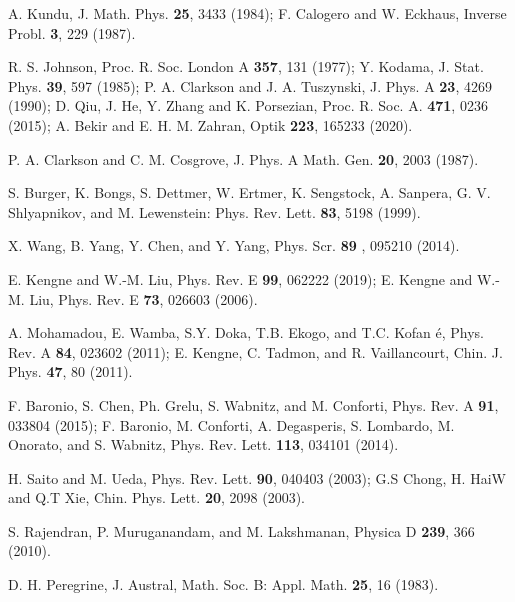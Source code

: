 \documentclass[preprintnumbers]{revtex4}
\begin{document}
\begin{thebibliography}{99}
 A. Kundu, J. Math. Phys. \textbf{25}, 3433 (1984); F. Calogero
and W. Eckhaus, Inverse Probl. \textbf{3}, 229 (1987).

 R. S. Johnson, Proc. R. Soc. London A \textbf{357}, 131 (1977);
Y. Kodama, J. Stat. Phys. \textbf{39}, 597 (1985); P. A. Clarkson and J. A.
Tuszynski, J. Phys. A \textbf{23}, 4269 (1990); D. Qiu, J. He, Y. Zhang and
K. Porsezian, Proc. R. Soc. A. \textbf{471}, 0236 (2015); A. Bekir and E. H.
M. Zahran, Optik \textbf{223}, 165233 (2020).

 P. A. Clarkson and C. M. Cosgrove, J. Phys. A Math. Gen.
\textbf{20}, 2003 (1987).

 S. Burger, K. Bongs, S. Dettmer, W. Ertmer, K. Sengstock, A.
Sanpera, G. V. Shlyapnikov, and M. Lewenstein: Phys. Rev. Lett. \textbf{83},
5198 (1999).

 X. Wang, B. Yang, Y. Chen, and Y. Yang, Phys. Scr. \textbf{89}%
, 095210 (2014).

 E. Kengne and W.-M. Liu, Phys. Rev. E \textbf{99}, 062222
(2019); E. Kengne and W.-M. Liu, Phys. Rev. E \textbf{73}, 026603 (2006).

 A. Mohamadou, E. Wamba, S.Y. Doka, T.B. Ekogo, and T.C. Kofan%
\'{e}, Phys. Rev. A \textbf{84}, 023602 (2011); E. Kengne, C. Tadmon, and R.
Vaillancourt, Chin. J. Phys. \textbf{47}, 80 (2011).

 F. Baronio, S. Chen, Ph. Grelu, S. Wabnitz, and M. Conforti,
Phys. Rev. A \textbf{91}, 033804 (2015); F. Baronio, M. Conforti, A.
Degasperis, S. Lombardo, M. Onorato, and S. Wabnitz, Phys. Rev. Lett.
\textbf{113}, 034101 (2014).

 H. Saito and M. Ueda, Phys. Rev. Lett. \textbf{90}, 040403
(2003); G.S Chong, H. HaiW and Q.T Xie, Chin. Phys. Lett. \textbf{20}, 2098
(2003).

 S. Rajendran, P. Muruganandam, and M. Lakshmanan, Physica D
\textbf{239}, 366 (2010).

 D. H. Peregrine, J. Austral, Math. Soc. B: Appl. Math. \textbf{%
25}, 16 (1983).
\end{thebibliography}
\end{document}
